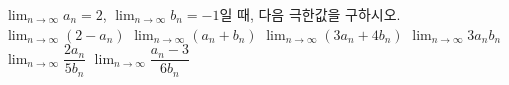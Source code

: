 $\displaystyle\lim_{n\to\infty} a_n=2$, $\displaystyle\lim_{n\to\infty} b_n=-1$일 때, 다음 극한값을 구하시오.
 $\displaystyle\lim_{n\to\infty}(2-a_n)$
 $\displaystyle\lim_{n\to\infty}(a_n+b_n)$
 $\displaystyle\lim_{n\to\infty}(3a_n+4b_n)$
 $\displaystyle\lim_{n\to\infty}3a_nb_n$
 $\displaystyle\lim_{n\to\infty}\dfrac{2a_n}{5b_n}$
 $\displaystyle\lim_{n\to\infty}\dfrac{a_n-3}{6b_n}$
